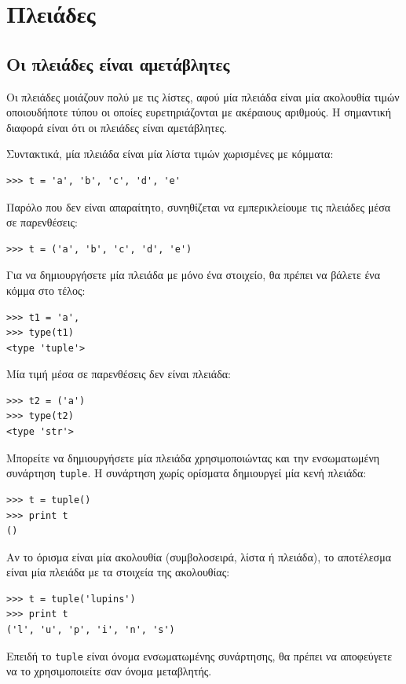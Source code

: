 \documentclass[10pt]{book}
\begin{document}
 
 
\chapter{Πλειάδες}
\label{tuplechap}

\section{Οι πλειάδες είναι αμετάβλητες}

Οι πλειάδες μοιάζουν πολύ με τις λίστες, αφού μία πλειάδα είναι μία ακολουθία τιμών οποιουδήποτε τύπου οι οποίες ευρετηριάζονται με ακέραιους αριθμούς. Η σημαντική διαφορά είναι ότι οι πλειάδες είναι αμετάβλητες. 

Συντακτικά, μία πλειάδα είναι μία λίστα τιμών χωρισμένες με κόμματα:

\begin{verbatim}
>>> t = 'a', 'b', 'c', 'd', 'e'
\end{verbatim}
%
Παρόλο που δεν είναι απαραίτητο, συνηθίζεται να εμπερικλείουμε τις πλειάδες μέσα σε παρενθέσεις:

\begin{verbatim}
>>> t = ('a', 'b', 'c', 'd', 'e')
\end{verbatim}
%
Για να δημιουργήσετε μία πλειάδα με μόνο ένα στοιχείο, θα πρέπει να βάλετε ένα κόμμα στο τέλος:

\begin{verbatim}
>>> t1 = 'a',
>>> type(t1)
<type 'tuple'>
\end{verbatim}
%
Μία τιμή μέσα σε παρενθέσεις δεν είναι πλειάδα:

\begin{verbatim}
>>> t2 = ('a')
>>> type(t2)
<type 'str'>
\end{verbatim}
%
Μπορείτε να δημιουργήσετε μία πλειάδα χρησιμοποιώντας και την ενσωματωμένη συνάρτηση {\tt tuple}. Η συνάρτηση χωρίς ορίσματα δημιουργεί μία κενή πλειάδα:

\begin{verbatim}
>>> t = tuple()
>>> print t
()
\end{verbatim}
%
Αν το όρισμα είναι μία ακολουθία (συμβολοσειρά, λίστα ή πλειάδα), το αποτέλεσμα είναι μία πλειάδα με τα στοιχεία της ακολουθίας:

\begin{verbatim}
>>> t = tuple('lupins')
>>> print t
('l', 'u', 'p', 'i', 'n', 's')
\end{verbatim}
%
Επειδή το {\tt tuple} είναι όνομα ενσωματωμένης συνάρτησης, θα πρέπει να αποφεύγετε να το χρησιμοποιείτε σαν όνομα μεταβλητής.
\end{document}
